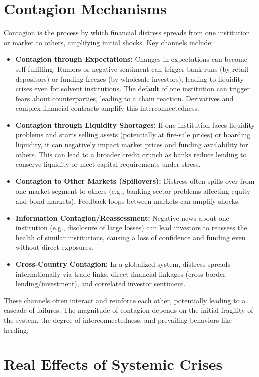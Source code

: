 \section{Contagion Mechanisms}

Contagion is the process by which financial distress spreads from one institution or market to others, amplifying initial shocks. Key channels include:

\begin{itemize}
    \item \textbf{Contagion through Expectations:} Changes in expectations can become self-fulfilling. Rumors or negative sentiment can trigger bank runs (by retail depositors) or funding freezes (by wholesale investors), leading to liquidity crises even for solvent institutions. The default of one institution can trigger fears about counterparties, leading to a chain reaction. Derivatives and complex financial contracts amplify this interconnectedness.
    \item \textbf{Contagion through Liquidity Shortages:} If one institution faces liquidity problems and starts selling assets (potentially at fire-sale prices) or hoarding liquidity, it can negatively impact market prices and funding availability for others. This can lead to a broader credit crunch as banks reduce lending to conserve liquidity or meet capital requirements under stress.
    \item \textbf{Contagion to Other Markets (Spillovers):} Distress often spills over from one market segment to others (e.g., banking sector problems affecting equity and bond markets). Feedback loops between markets can amplify shocks.
    \item \textbf{Information Contagion/Reassessment:} Negative news about one institution (e.g., disclosure of large losses) can lead investors to reassess the health of similar institutions, causing a loss of confidence and funding even without direct exposures.
    \item \textbf{Cross-Country Contagion:} In a globalized system, distress spreads internationally via trade links, direct financial linkages (cross-border lending/investment), and correlated investor sentiment.
\end{itemize}
These channels often interact and reinforce each other, potentially leading to a cascade of failures. The magnitude of contagion depends on the initial fragility of the system, the degree of interconnectedness, and prevailing behaviors like herding.

\section{Real Effects of Systemic Crises}

